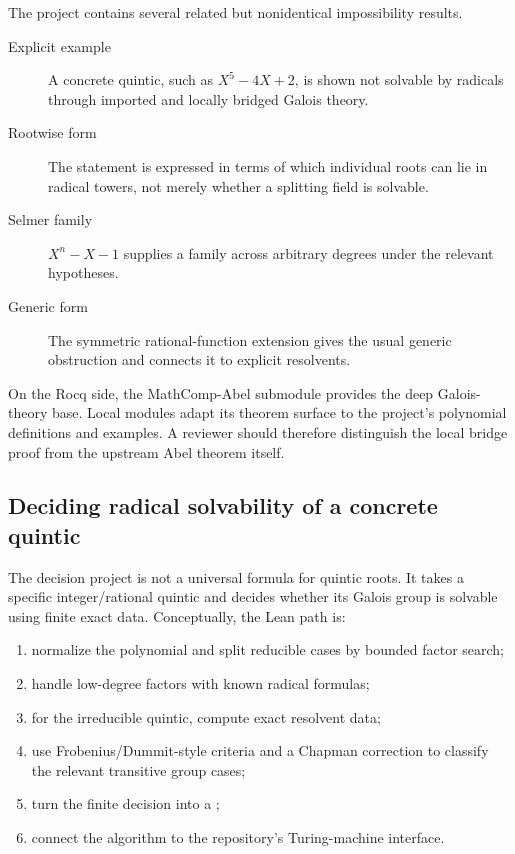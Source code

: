 \documentclass[
  10pt,
  a4paper,
  twoside,
  open=any,
  parskip=half,
  headings=big
]{scrreprt}
\newcommand{\code}[1]{\texttt{\detokenize{#1}}}
\begin{document}
The project contains several related but nonidentical impossibility results.

\begin{description}
  \item[Explicit example] A concrete quintic, such as \(X^5-4X+2\), is shown
        not solvable by radicals through imported and locally bridged Galois
        theory.
  \item[Rootwise form] The statement is expressed in terms of which individual
        roots can lie in radical towers, not merely whether a splitting field
        is solvable.
  \item[Selmer family] \(X^n-X-1\) supplies a family across arbitrary degrees
        under the relevant hypotheses.
  \item[Generic form] The symmetric rational-function extension gives the
        usual generic obstruction and connects it to explicit resolvents.
\end{description}

On the Rocq side, the MathComp-Abel submodule provides the deep Galois-theory
base.  Local modules adapt its theorem surface to the project's polynomial
definitions and examples.  A reviewer should therefore distinguish the local
bridge proof from the upstream Abel theorem itself.

\subsection{Deciding radical solvability of a concrete quintic}

The decision project is not a universal formula for quintic roots.  It takes a
specific integer/rational quintic and decides whether its Galois group is
solvable using finite exact data.  Conceptually, the Lean path is:

\begin{enumerate}
  \item normalize the polynomial and split reducible cases by bounded
        factor search;
  \item handle low-degree factors with known radical formulas;
  \item for the irreducible quintic, compute exact resolvent data;
  \item use Frobenius/Dummit-style criteria and a Chapman correction to
        classify the relevant transitive group cases;
  \item turn the finite decision into a \code{ComputablePred};
  \item connect the algorithm to the repository's Turing-machine interface.
\end{enumerate}
\end{document}
